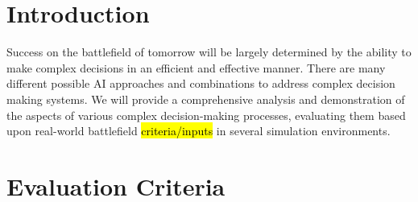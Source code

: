 \documentclass{article}
\title{\Title}
\author{
\textbf{Technical POC:} Daniel E. Krutz\\
       dxkvse@rit.edu\\
}
\date{} %
\begin{document}
\maketitle

\section{Introduction} %



Success on the battlefield of tomorrow will be largely determined by the ability to make complex decisions in an efficient and effective manner. There are many different possible AI approaches and combinations to address complex decision making systems. We will provide a comprehensive analysis and demonstration of the aspects of various complex decision-making processes, evaluating them based upon real-world battlefield \hl{criteria/inputs} in several simulation environments. 








\section{Evaluation Criteria} %

    

\end{document}

